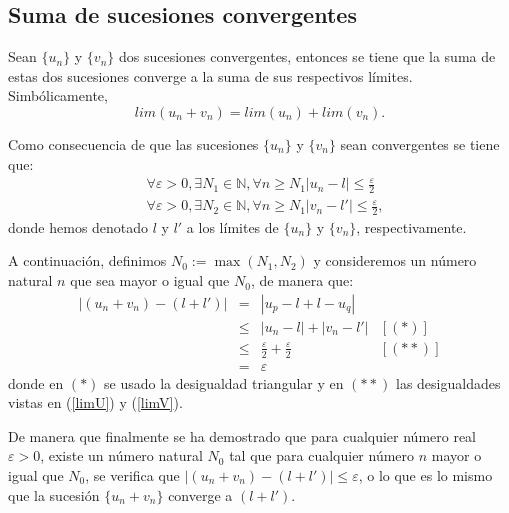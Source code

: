 \subsection{Suma de sucesiones convergentes}

\begin{teorema}
  Sean \(\{u_n\}\) y \(\{v_n\}\) dos sucesiones convergentes, entonces
  se tiene que la suma de estas dos sucesiones converge a la suma de sus
  respectivos límites. Simbólicamente,
  \begin{equation}
  lim (u_n + v_n) = lim (u_n) + lim (v_n).
  \end{equation}
\end{teorema}

\begin{demostracion}
  Como consecuencia de que las sucesiones \(\{u_n\}\) y \(\{v_n\}\) sean
  convergentes se tiene que:
  \begin{align}
    & ∀ ε > 0, ∃ N_1 ∈ ℕ, ∀ n ≥ N_1 |u_n - l| ≤ \frac{ε}{2} \label{limU} \\
    & ∀ ε > 0, ∃ N_2 ∈ ℕ, ∀ n ≥ N_1 |v_n - l'| ≤ \frac{ε}{2}, \label{limV}
  \end{align}
  donde hemos denotado \(l\) y \(l'\) a los límites de \(\{u_n\}\) y
  \(\{v_n\}\), respectivamente.

  A continuación, definimos \(N_0 := \max(N_1,N_2)\) y consideremos un
  número natural \(n\) que sea mayor o igual que \(N_0\), de manera que:
  \[\begin{array}{llll}
      |(u_n+v_n)-(l+l')| &= &|u_p-l+l-u_q|           & \\
                         &≤ &|u_n-l|+|v_n-l'|        & [(*)] \\
                         &≤ &\frac{ε}{2}+\frac{ε}{2} & [(**)] \\
                         &= &ε
  \end{array}\]
  donde en \((*)\) se usado la desigualdad triangular y en \((**)\) las
  desigualdades vistas en (\ref{limU}) y (\ref{limV}).

  De manera que finalmente se ha demostrado que para cualquier número
  real \(ε > 0\), existe un número natural \(N_0\) tal que para
  cualquier número \(n\) mayor o igual que \(N_0\), se verifica que
  \(|(u_n+v_n)-(l+l')| ≤ ε\), o lo que es lo mismo que la sucesión
  \(\{u_n+v_n\}\) converge a \((l+l')\).
\end{demostracion}

